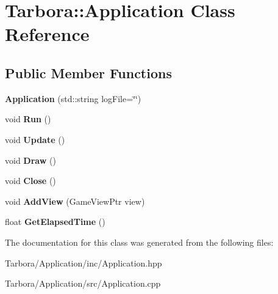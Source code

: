 \hypertarget{classTarbora_1_1Application}{}\section{Tarbora\+:\+:Application Class Reference}
\label{classTarbora_1_1Application}
\subsection*{Public Member Functions}
\begin{DoxyCompactItemize}
\item 
\mbox{\label{classTarbora_1_1Application_a649b32cb0f0c8aa9d8b5c662dd648e77}} 
{\bfseries Application} (std\+::string log\+File=\char`\"{}\char`\"{})
\item 
\mbox{\label{classTarbora_1_1Application_a9f55222e851dbfeef7b594e44704f1d9}} 
void {\bfseries Run} ()
\item 
\mbox{\label{classTarbora_1_1Application_a92b619d30ed4d4b91b1de30fe768dd44}} 
void {\bfseries Update} ()
\item 
\mbox{\label{classTarbora_1_1Application_af0be99b67505b582127c5b52294658c5}} 
void {\bfseries Draw} ()
\item 
\mbox{\label{classTarbora_1_1Application_abe4792a90c2e190c74e0babd20931d1d}} 
void {\bfseries Close} ()
\item 
\mbox{\label{classTarbora_1_1Application_a7746a5bd5d3642d4c11a9c3c1f5c7506}} 
void {\bfseries Add\+View} (Game\+View\+Ptr view)
\item 
\mbox{\label{classTarbora_1_1Application_a510f6b85a2b745c28401ebb800d9b711}} 
float {\bfseries Get\+Elapsed\+Time} ()
\end{DoxyCompactItemize}


The documentation for this class was generated from the following files\+:\begin{DoxyCompactItemize}
\item 
Tarbora/\+Application/inc/Application.\+hpp\item 
Tarbora/\+Application/src/Application.\+cpp\end{DoxyCompactItemize}
